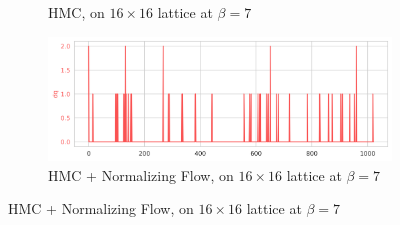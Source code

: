 \documentclass[a4paper,11pt]{article}
\begin{document}
\begin{figure}[htpb]
\begin{subfigure}[b]{0.49\textwidth}
        \caption{\label{subfig:dqHMC16}HMC, on \(16 \times 16\) lattice at
        \(\beta = 7\)}
    \end{subfigure}
    \hfill
    \begin{subfigure}[b]{0.49\textwidth}
        \includegraphics[width=\textwidth]{assets/fthmc_dq_live_16x16_xfer_beta7.png}
        \caption{\label{subfig:dqftHMC16}HMC + Normalizing Flow, on
        \(16 \times 16\) lattice at \(\beta = 7\)}
    \end{subfigure}
\end{figure}








\end{document}
